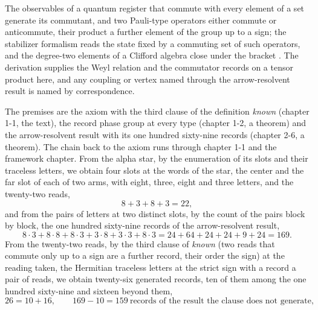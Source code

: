\begin{chbridge}
The observables of a quantum register that commute with every element of a set generate its commutant, and two Pauli-type operators either commute or anticommute, their product a further element of the group up to a sign; the stabilizer formalism reads the state fixed by a commuting set of such operators, and the degree-two elements of a Clifford algebra close under the bracket \cite{Gottesman1997,Weyl1927}. The derivation supplies the Weyl relation and the commutator records on a tensor product here, and any coupling or vertex named through the arrow-resolvent result is named by correspondence.
\end{chbridge}
\begin{chproof}[exact]
The premises are the axiom with the third clause of the definition \emph{known} (chapter 1-1, the text), the record phase group at every type (chapter 1-2, a theorem) and the arrow-resolvent result with its one hundred sixty-nine records (chapter 2-6, a theorem). The chain back to the axiom runs through chapter 1-1 and the framework chapter. From the alpha star, by the enumeration of its slots and their traceless letters, we obtain four slots at the words of the star, the center and the far slot of each of two arms, with eight, three, eight and three letters, and the twenty-two reads,
\begin{equation}
8 + 3 + 8 + 3 = 22 ,
\end{equation}
and from the pairs of letters at two distinct slots, by the count of the pairs block by block, the one hundred sixty-nine records of the arrow-resolvent result,
\begin{equation}
8\cdot 3 + 8\cdot 8 + 8\cdot 3 + 3\cdot 8 + 3\cdot 3 + 8\cdot 3 = 24 + 64 + 24 + 24 + 9 + 24 = 169 .
\end{equation}
From the twenty-two reads, by the third clause of \emph{known} (two reads that commute only up to a sign are a further record, their order the sign) at the reading taken, the Hermitian traceless letters at the strict sign with a record a pair of reads, we obtain twenty-six generated records, ten of them among the one hundred sixty-nine and sixteen beyond them,
\begin{equation}
26 = 10 + 16,\qquad 169 - 10 = 159 \ \text{records of the result the clause does not generate} ,
\end{equation}

\end{chproof}
